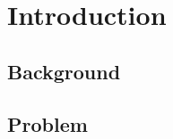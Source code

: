 \chapter{Introduction}
\label{sec:Introduction}


\section{Background}
\label{sec:Introduction:Background}

\section{Problem}
\label{sec:Introduction:Problem}




